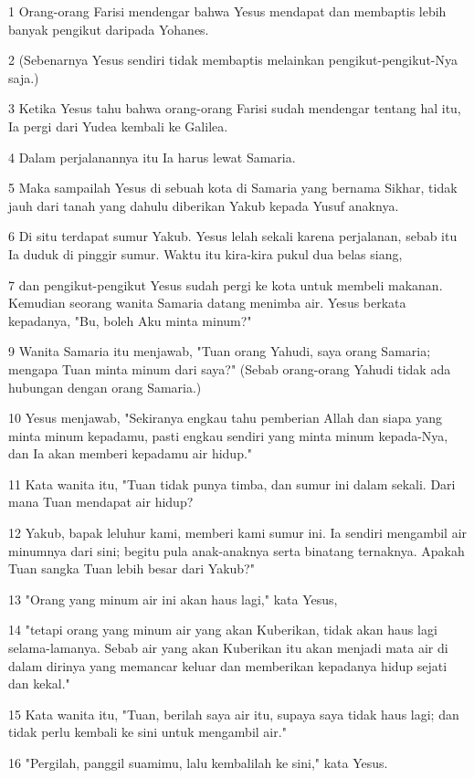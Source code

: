 \par 1 Orang-orang Farisi mendengar bahwa Yesus mendapat dan membaptis lebih banyak pengikut daripada Yohanes.
\par 2 (Sebenarnya Yesus sendiri tidak membaptis melainkan pengikut-pengikut-Nya saja.)
\par 3 Ketika Yesus tahu bahwa orang-orang Farisi sudah mendengar tentang hal itu, Ia pergi dari Yudea kembali ke Galilea.
\par 4 Dalam perjalanannya itu Ia harus lewat Samaria.
\par 5 Maka sampailah Yesus di sebuah kota di Samaria yang bernama Sikhar, tidak jauh dari tanah yang dahulu diberikan Yakub kepada Yusuf anaknya.
\par 6 Di situ terdapat sumur Yakub. Yesus lelah sekali karena perjalanan, sebab itu Ia duduk di pinggir sumur. Waktu itu kira-kira pukul dua belas siang,
\par 7 dan pengikut-pengikut Yesus sudah pergi ke kota untuk membeli makanan. Kemudian seorang wanita Samaria datang menimba air. Yesus berkata kepadanya, "Bu, boleh Aku minta minum?"
\par 9 Wanita Samaria itu menjawab, "Tuan orang Yahudi, saya orang Samaria; mengapa Tuan minta minum dari saya?" (Sebab orang-orang Yahudi tidak ada hubungan dengan orang Samaria.)
\par 10 Yesus menjawab, "Sekiranya engkau tahu pemberian Allah dan siapa yang minta minum kepadamu, pasti engkau sendiri yang minta minum kepada-Nya, dan Ia akan memberi kepadamu air hidup."
\par 11 Kata wanita itu, "Tuan tidak punya timba, dan sumur ini dalam sekali. Dari mana Tuan mendapat air hidup?
\par 12 Yakub, bapak leluhur kami, memberi kami sumur ini. Ia sendiri mengambil air minumnya dari sini; begitu pula anak-anaknya serta binatang ternaknya. Apakah Tuan sangka Tuan lebih besar dari Yakub?"
\par 13 "Orang yang minum air ini akan haus lagi," kata Yesus,
\par 14 "tetapi orang yang minum air yang akan Kuberikan, tidak akan haus lagi selama-lamanya. Sebab air yang akan Kuberikan itu akan menjadi mata air di dalam dirinya yang memancar keluar dan memberikan kepadanya hidup sejati dan kekal."
\par 15 Kata wanita itu, "Tuan, berilah saya air itu, supaya saya tidak haus lagi; dan tidak perlu kembali ke sini untuk mengambil air."
\par 16 "Pergilah, panggil suamimu, lalu kembalilah ke sini," kata Yesus.
